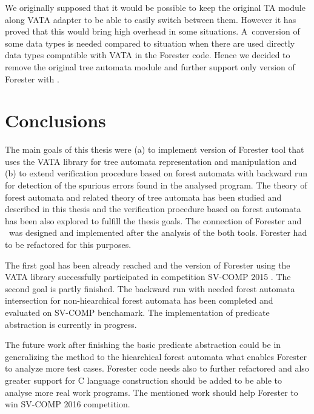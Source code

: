 \documentclass[fleqn,11pt]{ExcelAtFIT} %
\begin{document}
We originally supposed that it would be possible to keep the original TA module along VATA adapter
to be able to easily switch between them.
However it has proved that this would bring high overhead in some situations.
A~conversion of some data types is needed compared to situation when there are used directly data types compatible with VATA in the Forester code.
Hence we decided to remove the original tree automata module and further support only version of Forester with \vata.

\section{Conclusions}
\label{sec:concl}

The main goals of this thesis were (a) to implement version of Forester tool that uses the VATA library for tree automata representation and manipulation
and (b) to extend verification procedure based on forest automata with backward run for detection of the spurious errors found in the analysed program.
The theory of forest automata and related theory of tree automata has been studied and described in this thesis and the verification procedure
based on forest automata has been also explored to fulfill the thesis goals.
The connection of Forester and \vata\ was designed and implemented after the analysis of the both tools.
Forester had to be refactored for this purposes.

The first goal has been already reached and the version of Forester using the VATA library successfully participated in competition SV-COMP 2015 \cite{www:svcomp}.
The second goal is partly finished.
The backward run with needed forest automata intersection for non-hiearchical forest automata has been completed and evaluated on SV-COMP benchamark.
The implementation of predicate abstraction is currently in progress.

The future work after finishing the basic predicate abstraction could be in generalizing the method to the hiearchical forest automata
what enables Forester to analyze more test cases.
Forester code needs also to further refactored and also greater support for C language construction should be added to be
able to analyse more real work programs.
The mentioned work should help Forester to win SV-COMP 2016 competition.
\end{document}
